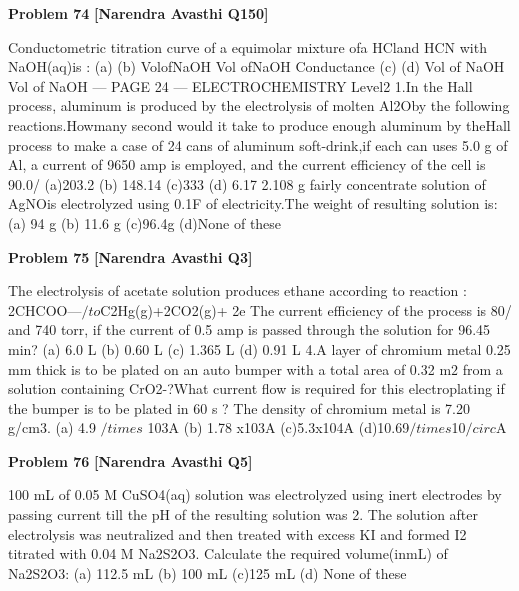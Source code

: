 \begin{problembox}
\textbf{Problem 74} \hfill \textbf{[Narendra Avasthi Q150]}
\label{q:ext-narendra_avasthi_all_questions-74}

Conductometric titration curve of a equimolar mixture ofa HCland HCN with NaOH(aq)is :
(a)
(b)
VolofNaOH
Vol ofNaOH
Conductance
(c)
(d)
Vol of NaOH
Vol of NaOH
--- PAGE 24 ---
ELECTROCHEMISTRY
Level2
1.In the Hall process, aluminum is produced by the electrolysis of molten Al2Oby the following
reactions.Howmany second would it take to produce enough aluminum by theHall process to
make a case of 24 cans of aluminum soft-drink,if each can uses 5.0 g of Al, a current of 9650
amp is employed, and the current efficiency of the cell is 90.0/%
(a)203.2
(b) 148.14
(c)333
(d) 6.17
2.108 g fairly concentrate solution of AgNOis electrolyzed using 0.1F of electricity.The weight
of resulting solution is:
(a) 94 g
(b) 11.6 g
(c)96.4g
(d)None of these
\end{problembox}

\begin{problembox}
\textbf{Problem 75} \hfill \textbf{[Narendra Avasthi Q3]}
\label{q:ext-narendra_avasthi_all_questions-75}

The electrolysis of acetate solution produces ethane according to reaction :
2CHCOO---$/to$C2Hg(g)+2CO2(g)+ 2e
The current efficiency of the process is 80/%
and 740 torr, if the current of 0.5 amp is passed through the solution for 96.45 min?
(a) 6.0 L
(b) 0.60 L
(c) 1.365 L
(d) 0.91 L
4.A layer of chromium metal 0.25 mm thick is to be plated on an auto bumper with a total area
of 0.32 m$2$ from a solution containing CrO2-?What current flow is required for this
electroplating if the bumper is to be plated in 60 s ? The density of chromium metal is
7.20 g/cm3.
(a) 4.9 $/times$ 103A
(b) 1.78 x103A
(c)5.3x104A
(d)10.69$/times$10$/circ$A
\end{problembox}

\begin{problembox}
\textbf{Problem 76} \hfill \textbf{[Narendra Avasthi Q5]}
\label{q:ext-narendra_avasthi_all_questions-76}

100 mL of 0.05 M CuSO4(aq) solution was electrolyzed using inert electrodes by passing
current till the pH of the resulting solution was 2. The solution after electrolysis was
neutralized and then treated with excess KI and formed I2 titrated with 0.04 M Na2S2O3.
Calculate the required volume(inmL) of Na2S2O3:
(a) 112.5 mL
(b) 100 mL
(c)125 mL
(d) None of these
\end{problembox}

